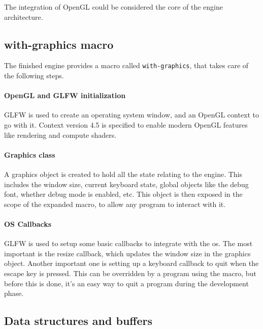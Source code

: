 
The integration of OpenGL could be considered the core of the engine architecture.

\subsection{with-graphics macro}

The finished engine provides a macro called \texttt{with-graphics},
that takes care of the following steps.

\paragraph{OpenGL and GLFW initialization}

GLFW is used to create an operating system window,
and an OpenGL context to go with it.
Context version 4.5 is specified to enable modern OpenGL features like rendering and compute shaders.

\paragraph{Graphics class}

A graphics object is created to hold all the state relating to the engine.
This includes the window size,
current keyboard state,
global objects like the debug font,
whether debug mode is enabled,
etc.
This object is then exposed in the scope of the expanded macro,
to allow any program to interact with it.

\paragraph{OS Callbacks}

GLFW is used to setup some basic callbacks to integrate with the \ac{os}.
The most important is the resize callback,
which updates the window size in the graphics object.
Another important one is setting up a keyboard callback to quit when the escape key is pressed.
This can be overridden by a program using the macro,
but before this is done,
it's an easy way to quit a program during the development phase.

\subsection{Data structures and buffers}

